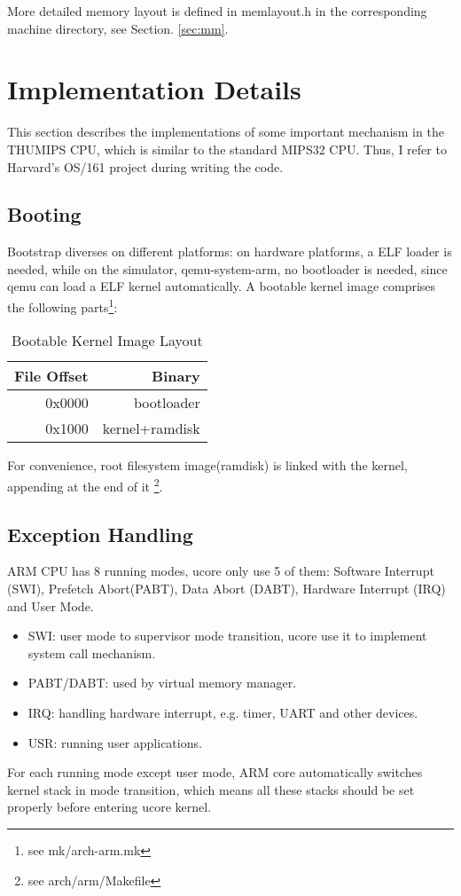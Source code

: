 \documentclass[a4paper]{article}
\begin{document}
More detailed memory layout is defined in memlayout.h in the corresponding
machine directory, see Section. \ref{sec:mm}.

\section{Implementation Details}
This section describes the implementations of some important mechanism 
in the THUMIPS CPU, which is similar to the standard MIPS32 CPU.
Thus, I refer to Harvard's OS/161\cite{OS161} project during writing the code.

\subsection{Booting}
Bootstrap diverses on different platforms: on hardware platforms, a ELF
loader is needed, while on the simulator, qemu-system-arm, no bootloader
is needed, since qemu can load a ELF kernel automatically.
A bootable kernel image  comprises  the following parts\footnote{see mk/arch-arm.mk}:

\begin{table}[h]
  \centering
  \begin{tabular}{|r|r|}
    \hline
    File Offset & Binary \\
    \hline
    0x0000      & bootloader \\
    0x1000      & kernel+ramdisk     \\
    \hline
  \end{tabular}
  \caption{Bootable Kernel Image Layout}
  \label{tab:layout}
\end{table}
For convenience, root filesystem image(ramdisk) is linked
with the kernel, appending at the end of it
\footnote{see arch/arm/Makefile}.


\subsection{Exception Handling}
ARM CPU has 8 running modes, ucore only use 5 of them: Software Interrupt (SWI), Prefetch Abort(PABT), 
Data Abort (DABT), Hardware Interrupt (IRQ) and User Mode.
\begin{itemize}
  \item SWI: user mode to supervisor mode transition,
    ucore use it to implement system call mechanism.
  \item PABT/DABT: used by virtual memory manager.
  \item IRQ: handling hardware interrupt, e.g. timer,
    UART and other devices.
  \item USR: running user applications.
\end{itemize}
For each running mode except user mode, ARM core automatically switches kernel stack in mode transition, which means all these stacks should be set properly before entering ucore kernel.
\end{document}
